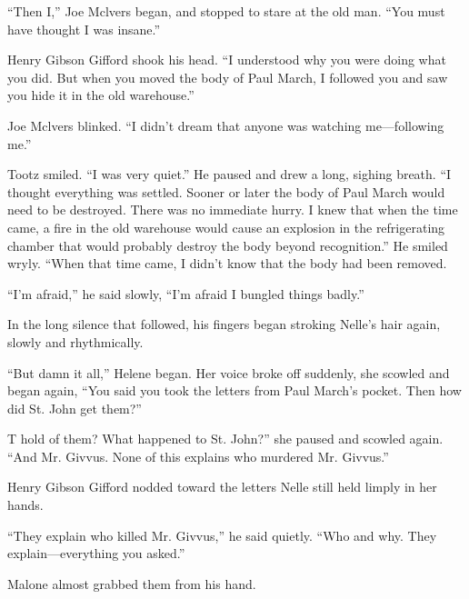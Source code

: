 \documentclass{novel}
\begin{document}
“Then I,” Joe Mclvers began, and stopped to stare at the old man. “You must have thought I was insane.”

Henry Gibson Gifford shook his head. “I understood why you were doing what you did. But when you moved the body of Paul March, I followed you and saw you hide it in the old warehouse.”

Joe Mclvers blinked. “I didn’t dream that anyone was watching me—following me.”

Tootz smiled. “I was very quiet.” He paused and drew a long, sighing breath. “I thought everything was settled. Sooner or later the body of Paul March would need to be destroyed. There was no immediate hurry. I knew that when the time came, a fire in the old warehouse would cause an explosion in the refrigerating chamber that would probably destroy the body beyond recognition.” He smiled wryly. “When that time came, I didn’t know that the body had been removed.

“I’m afraid,” he said slowly, “I’m afraid I bungled things badly.”

In the long silence that followed, his fingers began stroking Nelle’s hair again, slowly and rhythmically.

“But damn it all,” Helene began. Her voice broke off suddenly, she scowled and began again, “You said you took the letters from Paul March’s pocket. Then how did St. John get them?”

T hold of them? What happened to St. John?” she paused and scowled again. “And Mr. Givvus. None of this explains who murdered Mr. Givvus.”

Henry Gibson Gifford nodded toward the letters Nelle still held limply in her hands.

“They explain who killed Mr. Givvus,” he said quietly. “Who and why. They explain—everything you asked.”

\vspace{2\nbs}
\clearpage
\thispagestyle{empty}

\begin{ChapterStart}
\vspace{3\nbs}
\end{ChapterStart}

Malone almost grabbed them from his hand.
\end{document}
